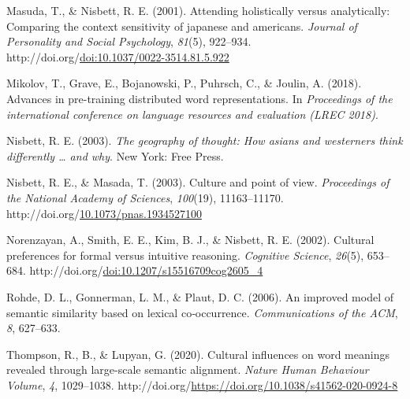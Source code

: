 \documentclass[10pt, letterpaper]{article}
\newenvironment{CSLReferences}%
  {}%
  {\par}
\begin{document}
\begin{CSLReferences}{1}{0}
\leavevmode{}%
Masuda, T., \& Nisbett, R. E. (2001). Attending holistically versus
analytically: Comparing the context sensitivity of japanese and
americans. \emph{Journal of Personality and Social Psychology},
\emph{81}(5), 922--934.
http://doi.org/\href{https://doi.org/doi:10.1037/0022-3514.81.5.922}{doi:10.1037/0022-3514.81.5.922}

\leavevmode{}%
Mikolov, T., Grave, E., Bojanowski, P., Puhrsch, C., \& Joulin, A.
(2018). Advances in pre-training distributed word representations. In
\emph{Proceedings of the international conference on language resources
and evaluation (LREC 2018)}.

\leavevmode{}%
Nisbett, R. E. (2003). \emph{The geography of thought: How asians and
westerners think differently {\ldots{}} and why}. New York: Free Press.

\leavevmode{}%
Nisbett, R. E., \& Masada, T. (2003). Culture and point of view.
\emph{Proceedings of the National Academy of Sciences}, \emph{100}(19),
11163--11170.
http://doi.org/\href{https://doi.org/10.1073/pnas.1934527100}{10.1073/pnas.1934527100}

\leavevmode{}%
Norenzayan, A., Smith, E. E., Kim, B. J., \& Nisbett, R. E. (2002).
Cultural preferences for formal versus intuitive reasoning.
\emph{Cognitive Science}, \emph{26}(5), 653--684.
http://doi.org/\href{https://doi.org/doi:10.1207/s15516709cog2605_4}{doi:10.1207/s15516709cog2605\_4}

\leavevmode{}%
Rohde, D. L., Gonnerman, L. M., \& Plaut, D. C. (2006). An improved
model of semantic similarity based on lexical co‐occurrence.
\emph{Communications of the ACM}, \emph{8}, 627--633.

\leavevmode{}%
Thompson, R., B., \& Lupyan, G. (2020). Cultural influences on word
meanings revealed through large-scale semantic alignment. \emph{Nature
Human Behaviour Volume}, \emph{4}, 1029--1038.
http://doi.org/\url{https://doi.org/10.1038/s41562-020-0924-8}

\end{CSLReferences}


\end{document}
